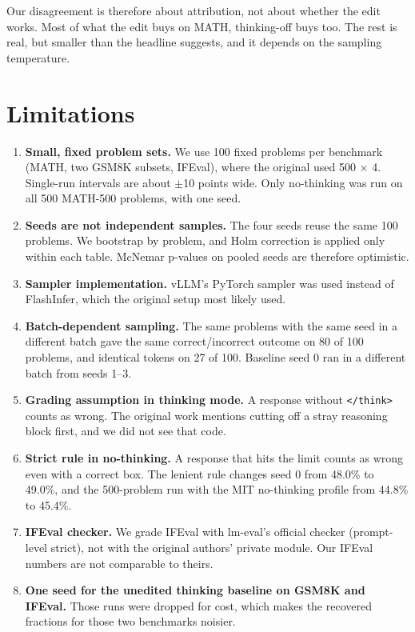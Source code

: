 \documentclass[11pt]{article}
\begin{document}
Our disagreement is therefore about attribution, not about whether the edit works. Most of what the edit buys on MATH, thinking-off buys too. The rest is real, but smaller than the headline suggests, and it depends on the sampling temperature.

\section{Limitations}\label{sec:12}

\begin{enumerate}[nosep,leftmargin=*]
\item \textbf{Small, fixed problem sets.} We use 100 fixed problems per benchmark (MATH, two GSM8K subsets, IFEval), where the original used 500 $\times$ 4. Single-run intervals are about $\pm$10 points wide. Only no-thinking was run on all 500 MATH-500 problems, with one seed.
\item \textbf{Seeds are not independent samples.} The four seeds reuse the same 100 problems. We bootstrap by problem, and Holm correction is applied only within each table. McNemar p-values on pooled seeds are therefore optimistic.
\item \textbf{Sampler implementation.} vLLM's PyTorch sampler was used instead of FlashInfer, which the original setup most likely used.
\item \textbf{Batch-dependent sampling.} The same problems with the same seed in a different batch gave the same correct/incorrect outcome on 80 of 100 problems, and identical tokens on 27 of 100. Baseline seed 0 ran in a different batch from seeds 1--3.
\item \textbf{Grading assumption in thinking mode.} A response without \texttt{\textless{}/think\textgreater{}} counts as wrong. The original work mentions cutting off a stray reasoning block first, and we did not see that code.
\item \textbf{Strict rule in no-thinking.} A response that hits the limit counts as wrong even with a correct box. The lenient rule changes seed 0 from 48.0\% to 49.0\%, and the 500-problem run with the MIT no-thinking profile from 44.8\% to 45.4\%.
\item \textbf{IFEval checker.} We grade IFEval with lm-eval's official checker (prompt-level strict), not with the original authors' private module. Our IFEval numbers are not comparable to theirs.
\item \textbf{One seed for the unedited thinking baseline on GSM8K and IFEval.} Those runs were dropped for cost, which makes the recovered fractions for those two benchmarks noisier.

\end{enumerate}
\end{document}
